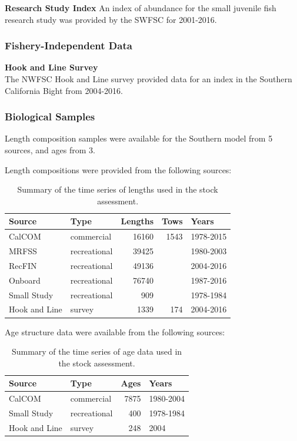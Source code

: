 \documentclass[12pt,]{article}
\begin{document}
\textbf{Research Study Index} An index of abundance for the small
juvenile fish research study was provided by the SWFSC for 2001-2016.

\subsubsection{Fishery-Independent
Data}\label{fishery-independent-data-1}

\textbf{Hook and Line Survey}\\
The NWFSC Hook and Line survey provided data for an index in the
Southern California Bight from 2004-2016.

\subsubsection{Biological Samples}\label{biological-samples-1}

Length composition samples were available for the Southern model from 5
sources, and ages from 3.

Length compositions were provided from the following sources:

\vspace{.5cm}

\begin{table}[ht]
\centering
\caption{Summary of the time series of lengths used in the stock assessment.} 
\label{tab:Length_sources}
\begin{tabular}{llrrl}
  \hline
Source & Type & Lengths & Tows & Years \\ 
  \hline
CalCOM & commercial & 16160 & 1543 & 1978-2015 \\ 
  MRFSS & recreational & 39425 &  & 1980-2003 \\ 
  RecFIN & recreational & 49136 &  & 2004-2016 \\ 
  Onboard & recreational & 76740 &  & 1987-2016 \\ 
  Small Study & recreational & 909 &  & 1978-1984 \\ 
  Hook and Line & survey & 1339 & 174 & 2004-2016 \\ 
   \hline
\end{tabular}
\end{table}

Age structure data were available from the following sources:

\vspace{.5cm}

\begin{table}[ht]
\centering
\caption{Summary of the
                                              time series of age data used in the stock
                                              assessment.} 
\label{tab:Age_sources}
\begin{tabular}{llrl}
  \hline
Source & Type & Ages & Years \\ 
  \hline
CalCOM & commercial & 7875 & 1980-2004 \\ 
  Small Study & recreational & 400 & 1978-1984 \\ 
  Hook and Line & survey & 248 & 2004 \\ 
   \hline
\end{tabular}
\end{table}
\end{document}
